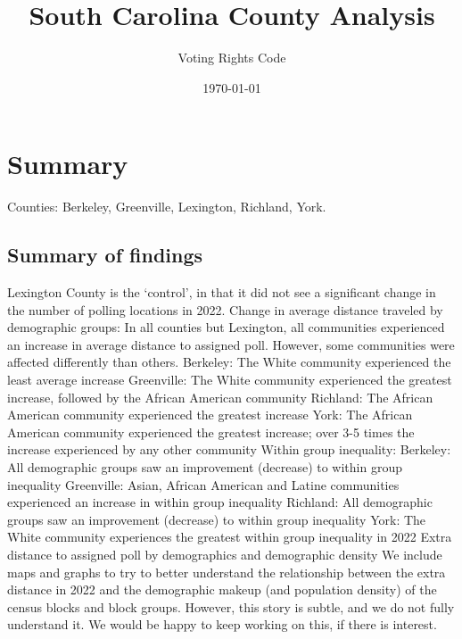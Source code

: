 \documentclass[11pt]{article}
\title{South Carolina County Analysis}
\author{Voting Rights Code}
\date{\today}
\theoremstyle{remark}
\theoremstyle{definition}
\begin{document}
\maketitle
\section{Summary}
	
	Counties: Berkeley, Greenville, Lexington, Richland, York.
\subsection{Summary of findings}

\begin{outline}
	\1 Lexington County is the `control', in that it did not see a significant change in the number of polling locations in 2022.
	\1 Change in average distance traveled by demographic groups:
		\2 In all counties but Lexington, all communities experienced an increase in average distance to assigned poll. However, some communities were affected differently than others. 
		\2 Berkeley: The White community experienced the least average increase
		\2 Greenville: The White community experienced the greatest increase, followed by the African American community
		\2 Richland: The African American community experienced the greatest increase
		\2 York: The African American community experienced the greatest increase; over 3-5 times the increase experienced by any other community
	\1 Within group inequality:
		\2 Berkeley: All demographic groups saw an improvement (decrease) to within group inequality
		\2 Greenville: Asian, African American and Latine communities experienced an increase in within group inequality
		\2 Richland: All demographic groups saw an improvement (decrease) to within group inequality
		\2 York: The White community experiences the greatest within group inequality in 2022
	\1 Extra distance to assigned poll by demographics and demographic density
		\2 We include maps and graphs to try to better understand the relationship between the extra distance in 2022 and the demographic makeup (and population density) of the census blocks and block groups. However, this story is subtle, and we do not fully understand it. We would be happy to keep working on this, if there is interest.
\end{outline}
	
	
\end{document}
